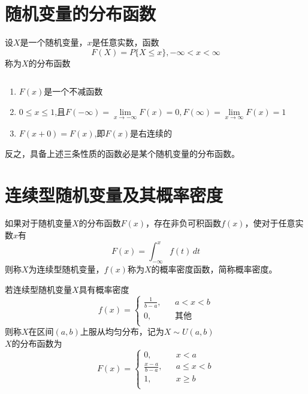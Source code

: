 \section{随机变量的分布函数}
\begin{definition}[随机变量的分布函数]
    设$X$是一个随机变量，$x$是任意实数，函数
    $$F(X)=P\{X\leq x\},-\infty<x<\infty$$
    称为$X$的分布函数
\end{definition}

\begin{theorem}[分布函数性质]
      $\quad$  

    \begin{enumerate}
        \item $F(x)$是一个不减函数
        \item $0\leq x\leq 1$,且$F(-\infty)=\lim\limits_{x \to -\infty}  F(x)=0,F(\infty)=\lim\limits_{x \to \infty}  F(x)=1$
        \item $F(x+0)=F(x)$,即$F(x)$是右连续的
    \end{enumerate}

    反之，具备上述三条性质的函数必是某个随机变量的分布函数。
\end{theorem}

\section{连续型随机变量及其概率密度}
\begin{definition}
    如果对于随机变量$X$的分布函数$F(x)$，存在非负可积函数$f(x)$，使对于任意实数$x$有
    $$F(x)=\int_{-\infty}^{x} f(t) \,dt $$
    则称$X$为{\heiti 连续型随机变量}，$f(x)$称为$X$的概率密度函数，简称{\heiti 概率密度}。
\end{definition}

\begin{definition}[均匀分布]
    若连续型随机变量$X$具有概率密度
    $$ f(x)=\left\{
    \begin{array}{lll}
    \frac{1}{b-a}, &  & a<x<b\\
    0,&  &  \mbox{其他} \\
    \end{array}\right. $$
    则称$X$在区间$(a,b)$上服从均匀分布，记为$X\sim U(a,b)$\\
    $X$的分布函数为
    $$ F(x)=\left\{
        \begin{array}{lll}
        0, &  & x<a\\
        \frac{x-a}{b-a}, &  &a\leq x<b\\
        1,&  &  x\geq b \\
        \end{array}\right. $$
\end{definition}

